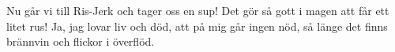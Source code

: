 \vspace{10pt}
Nu går vi till Ris-Jerk och tager oss en sup!
Det gör så gott i magen att får ett litet rus!
\revrpt Ja, jag lovar liv och död,
att på mig går ingen nöd,
så länge det finns brännvin
och flickor i överflöd.\rpt
